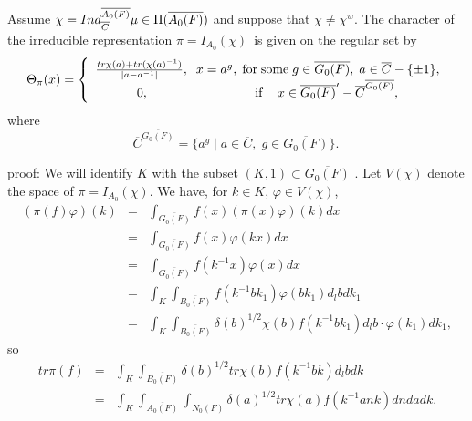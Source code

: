 \begin{lemma}
Assume $\chi =Ind_{\overline{C}}^{\overline{A_0(F)}}\mu \in \Pi (\overline{%
A_0(F)})$ and suppose that $\chi \neq \chi ^w$. The character of the
irreducible representation $\pi =I_{A_0}(\chi )$\ is given on the regular
set by 
\[
\Theta _\pi (x)=\left\{ 
\begin{array}{c}
\frac{tr\chi (a)+tr(\chi (a)^{-1})}{|a-a^{-1}|},\;\;x=a^g,\;{\rm for\;some}%
\;g\in \overline{G_0(F)},\;a\in \overline{C}-\{\pm 1\}, \\ 
0,\;\;\;\;\;\;\;\;\;\;\;\;\;\;\;\;\;\;\;\;\;\;\;\;\;\;\;\;\;{\rm \;if\;}%
\;\;\;x\in \overline{G_0(F)}^{\prime }-\overline{C}^{\overline{G_0(F)}},
\end{array}
\right. 
\]
where 
\[
\overline{C}^{\overline{G_0(F)}}=\{a^g\;|\;a\in \overline{C},\;g\in 
\overline{G_0(F)}\}.\ 
\]
\end{lemma}

proof: We will identify $K$ with the subset $(K,1)\subset \overline{G_0(F)}$%
. Let $V(\chi )$ denote the space of $\pi =I_{A_0}(\chi )$. We have, for $%
k\in K$, $\varphi \in V(\chi )$, 
\begin{eqnarray*}
(\pi (f)\varphi )(k) &=&\int_{\overline{G_0(F)}}f(x)(\pi (x)\varphi )(k)dx \\
\ &=&\int_{\overline{G_0(F)}}f(x)\varphi (kx)dx \\
\ &=&\int_{\overline{G_0(F)}}f(k^{-1}x)\varphi (x)dx \\
\ &=&\int_K\int_{\overline{B_0(F)}}f(k^{-1}bk_1)\varphi (bk_1)d_lbdk_1 \\
\ &=&\int_K\int_{\overline{B_0(F)}}\delta (b)^{1/2}\chi
(b)f(k^{-1}bk_1)d_lb\cdot \varphi (k_1)dk_1,
\end{eqnarray*}
so 
\begin{eqnarray}
tr\pi (f) &=&\int_K\int_{\overline{B_0(F)}}\delta (b)^{1/2}tr\chi
(b)f(k^{-1}bk)d_lbdk \\
\ &=&\int_K\int_{\overline{A_0(F)}}\int_{N_0(F)}\delta (a)^{1/2}tr\chi
(a)f(k^{-1}ank)dndadk.  \nonumber
\end{eqnarray}

